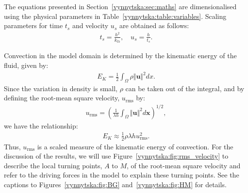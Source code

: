 The equations presented in Section~\ref{vynnytska:sec:maths} are
dimensionalised using the physical parameters in
Table~\ref{vynnytska:table:variables}. Scaling parameters for time
$t_s$ and velocity $u_s$ are obtained as follows:
\begin{align}
 \label{vynnytska:eq:velsc}
 t_s = \frac{h^2}{k_{th}}, \quad u_s = \frac{h}{t_s}.
\end{align}

Convection in the model domain is determined by the
kinematic energy of the fluid, given by:
\begin{align}
  \label{vynnytska:eq:KE}
  E_{K} = \frac{1}{2}\int_{\Omega}\rho \Vert \bm{u} \Vert^{2}dx.
\end{align}
Since the variation in density is small, $\rho$ can be taken out of
the integral, and by defining the root-mean square velocity, $u_{\mathrm{rms}}$
by:
\begin{align}
  \label{vynnytska:eq:u_rms}
  u_{\mathrm{rms}} =\left( \frac{1}{\lambda h} \int_{\Omega} \Vert \bm{u} \Vert^{2} d\bm{x}  \right)^{1/2},
\end{align}
we have the relationship:
\begin{align}
  \label{vynnytska:eq:KEu_rms}
  E_{K} \approx \frac{1}{2} \rho \lambda h u_{\mathrm{rms}}^{2}.
\end{align}
Thus, $u_{\mathrm{rms}}$ is a scaled measure of the kinematic energy of
convection. For the discussion of the results, we will use
Figure~\ref{vynnytska:fig:rms_velocity} to describe the local turning
points, $A$ to $M$, of the root-mean square velocity and refer to the
driving forces in the model to explain these turning points. See the
captions to Figures~\ref{vynnytska:fig:BG} and~\ref{vynnytska:fig:HM}
for details.

